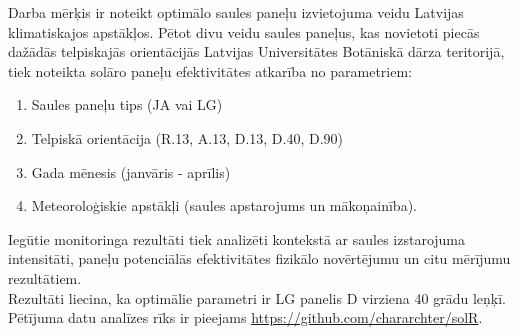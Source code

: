 Darba mērķis ir noteikt optimālo saules paneļu izvietojuma veidu Latvijas klimatiskajos apstākļos. 
Pētot divu veidu saules paneļus, kas novietoti piecās dažādās telpiskajās orientācijās Latvijas Universitātes Botāniskā dārza teritorijā, tiek noteikta solāro paneļu efektivitātes atkarība no parametriem:
\begin{enumerate}
\item Saules paneļu tips (JA vai LG)
\item Telpiskā orientācija (R.13, A.13, D.13, D.40, D.90)
\item Gada mēnesis (janvāris - aprīlis)
\item Meteoroloģiskie apstākļi (saules apstarojums un mākoņainība).
\end{enumerate}

Iegūtie monitoringa rezultāti tiek analizēti kontekstā ar saules izstarojuma intensitāti, paneļu potenciālās efektivitātes fizikālo novērtējumu un citu mērījumu rezultātiem.\\
Rezultāti liecina, ka optimālie parametri ir LG panelis D virziena 40 grādu leņķī. Pētījuma datu analīzes rīks ir pieejams \url{https://github.com/chararchter/solR}.

